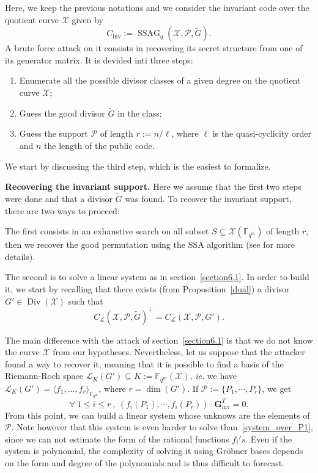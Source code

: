 \documentclass[10pt]{article}
\theoremstyle{definition}
\theoremstyle{definition}
\theoremstyle{definition}
\newcommand{\cd}{\cdot}
\newcommand{\fqm}{\mathbb{F}_{q^m}}
\newcommand{\su}{\subseteq}
\newcommand{\X}{\mathcal{X}}
\newcommand{\PR}{\mathcal{P}}
\newcommand{\Div}{\operatorname{Div}}
\newcommand{\ssag}{\operatorname{SSAG}}
\newcommand{\calL}{\mathcal{L}}
\begin{document}
Here, we keep the previous notations and we consider the invariant code over the quotient curve $\X$ given by
\[C_{\mathrm{inv}} := \ssag_q(\X,\PR,\tilde{G}).\]
A brute force attack on it consists in recovering its secret structure from one of its generator matrix. It is devided inti three steps:
\begin{enumerate}
\item Enumerate all the possible divisor classes of a given degree on the quotient curve $\X$;
\item Guess the good divisor $\tilde{G}$ in the class;
\item Guess the support $\PR$ of length $r:=n/\ell$, where $\ell$ is the quasi-cyclicity order and $n$ the length of the public code.
\end{enumerate}

We start by discussing the third step, which is the easiest to formalize. 

\vspace*{0.2cm}

\noindent \textbf{Recovering the invariant support.} Here we assume that the first two steps were done and that a divisor $\tilde{G}$ was found. To recover the invariant support, there are two ways to proceed: 

\vspace*{0.2cm}

\noindent The first consists in an exhaustive search on all subset $S \su \X(\fqm)$ of length $r$, then we recover the good permutation using the SSA algorithm (see \cite{SSA} for more details). 

\vspace*{0.2cm}

\noindent The second is to solve a linear system as in section~\ref{section6.1}. In order to build it, we start by recalling that there exists (from Proposition~\ref{dual}) a divisor $G' \in  \Div(\X)$ such that 
\[ C_{\calL}(\X,\PR,\tilde{G})^{\perp} = C_{\calL}(\X,\PR,G').\]

\noindent The main difference with the attack of section~\ref{section6.1} is that we do not know the curve $\X$ from our hypotheses. Nevertheless, let us suppose that the attacker found a way to recover it, meaning that it is possible to find a basis of the Riemann-Roch space $\calL_K(G') \su K:=\fqm(\X)$, \textit{ie.} we have $\calL_K(G') = \langle f_1,...,f_r \rangle_{\fqm}$, where $r = \dim(G')$. If $\PR := \{P_1,\cdots,P_r\}$, we get 
\begin{equation*}
\forall \ 1 \leq i \leq r \ , \ (f_i(P_1),\cdots,f_i(P_r)) \cd \mathbf{G}_{\mathrm{inv}}^T = 0.
\end{equation*}
From this point, we can build a linear system whose unknows are the elements of $\PR$.
Note however that this system is even harder to solve than~\eqref{system_over_P1}, since we can not estimate the form of the rational functions $f_i's$. Even if the system is polynomial, the complexity of solving it using Gröbner bases depends on the form and degree of the polynomials and is thus difficult to forecast.
\end{document}
